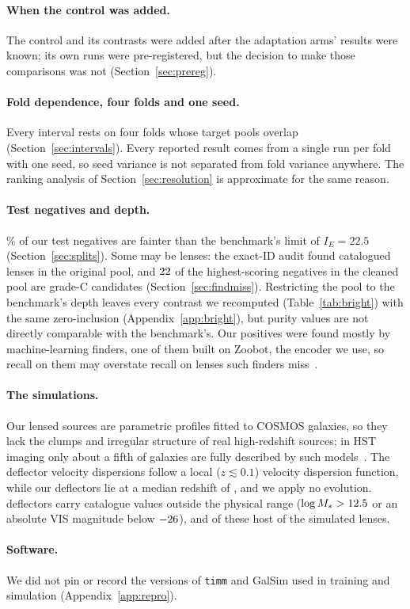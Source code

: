 \paragraph{When the control was added.} The control and its contrasts were added after the
adaptation arms' results were known; its own runs were pre-registered, but the decision to make
those comparisons was not (Section~\ref{sec:prereg}).

\paragraph{Fold dependence, four folds and one seed.} Every interval rests on four folds whose
target pools overlap (Section~\ref{sec:intervals}). Every reported result comes from a single
run per fold with one seed, so seed variance is not separated from fold variance anywhere. The
ranking analysis of Section~\ref{sec:resolution} is approximate for the same reason.

\paragraph{Test negatives and depth.} \FracFaintTest{}\% of our test negatives are fainter
than the benchmark's limit of
$I_E = 22.5$ (Section~\ref{sec:splits}). Some may be lenses: the exact-ID audit found
catalogued lenses in the original pool, and $22{}$ of the highest-scoring negatives in
the cleaned pool are grade-C
candidates (Section~\ref{sec:findmiss}). Restricting the pool to the benchmark's depth leaves
every contrast we recomputed (Table~\ref{tab:bright}) with the same zero-inclusion
(Appendix~\ref{app:bright}), but purity values are
not directly comparable with the benchmark's. Our positives were found mostly by
machine-learning finders, one of them built on Zoobot, the encoder we use, so recall on them may
overstate recall on lenses such finders miss~\citep{lines2025discoveryengineC, discoveryengineA}.

\paragraph{The simulations.} Our lensed sources are parametric profiles fitted to COSMOS
galaxies, so they lack the clumps and irregular structure of real high-redshift sources; in HST
imaging only about a fifth of galaxies are fully described by such
models~\citep{mandelbaum2014great3}. The deflector velocity dispersions follow a local
($z \lesssim 0.1$) velocity dispersion function, while our deflectors lie at a median redshift
of \simZlMedian{}, and we apply no evolution. \DeflUnphysN{} deflectors carry catalogue values outside the
physical range ($\log M_* > 12.5{}$ or an absolute VIS magnitude below $-26{}$),
and \DeflUnphysDrawn{} of these host \DeflUnphysLenses{} of the simulated lenses.

\paragraph{Software.} We did not pin or record the versions of \texttt{timm} and GalSim used in
training and simulation (Appendix~\ref{app:repro}).
